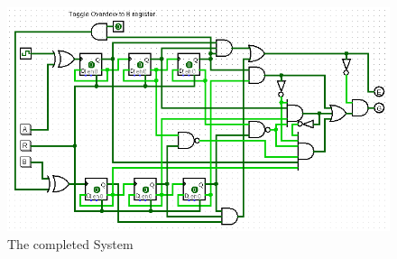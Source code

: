 \documentclass[11pt, article]{article}
\begin{document}
        \begin{landscape}
            \begin{figure}
                \centering
                    \includegraphics[scale=1]{system.png}
                \caption{The completed System}
                \label{fig:system}
            \end{figure}
        \end{landscape}
\end{document}
